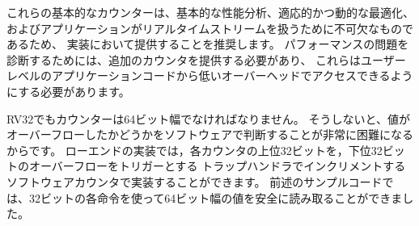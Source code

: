 \begin{commentary}
\begin{comment}
We recommend provision of these basic counters in implementations
as they are essential for basic performance analysis, adaptive and
dynamic optimization, and to allow an application to work with
real-time streams.  Additional counters should be provided to help
diagnose performance problems and these should be made accessible from
user-level application code with low overhead.
\end{comment}

これらの基本的なカウンターは、基本的な性能分析、適応的かつ動的な最適化、
およびアプリケーションがリアルタイムストリームを扱うために不可欠なものであるため、
実装において提供することを推奨します。
パフォーマンスの問題を診断するためには、追加のカウンタを提供する必要があり、
これらはユーザーレベルのアプリケーションコードから低いオーバーヘッドでアクセスできるようにする必要があります。

\begin{comment}
We required the counters be 64 bits wide, even on RV32, as otherwise
it is very difficult for software to determine if values have
overflowed.  For a low-end implementation, the upper 32 bits of each
counter can be implemented using software counters incremented by a
trap handler triggered by overflow of the lower 32 bits.  The sample
code described above shows how the full 64-bit width value can be
safely read using the individual 32-bit instructions.
\end{comment}

RV32でもカウンターは64ビット幅でなければなりません。
そうしないと、値がオーバーフローしたかどうかをソフトウェアで判断することが非常に困難になるからです。
ローエンドの実装では，各カウンタの上位32ビットを，下位32ビットのオーバーフローをトリガーとする
トラップハンドラでインクリメントするソフトウェアカウンタで実装することができます。
前述のサンプルコードでは、32ビットの各命令を使って64ビット幅の値を安全に読み取ることができました。

\begin{comment}
In some applications, it is important to be able to read multiple
counters at the same instant in time.  When run under a multitasking
environment, a user thread can suffer a context switch while
attempting to read the counters.  One solution is for the user thread
to read the real-time counter before and after reading the other
counters to determine if a context switch occurred in the middle of the
sequence, in which case the reads can be retried.  We considered
adding output latches to allow a user thread to snapshot the counter
values atomically, but this would increase the size of the user
context, especially for implementations with a richer set of counters.
\end{comment}


\end{commentary}
